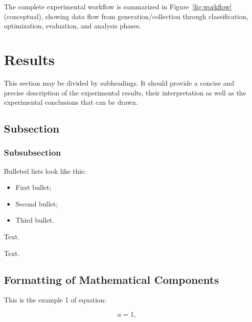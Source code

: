 \documentclass[journal,article,submit,pdftex,moreauthors]{Definitions/mdpi}
\begin{document}
The complete experimental workflow is summarized in Figure~\ref{fig:workflow} (conceptual), showing data flow from generation/collection through classification, optimization, evaluation, and analysis phases.

\section{Results}

This section may be divided by subheadings. It should provide a concise and precise description of the experimental results, their interpretation as well as the experimental conclusions that can be drawn.
\subsection{Subsection}
\subsubsection{Subsubsection}

Bulleted lists look like this:
\begin{itemize}
\item	First bullet;
\item	Second bullet;
\item	Third bullet.
\end{itemize}




Text.

Text.

\subsection{Formatting of Mathematical Components}

This is the example 1 of equation:
\begin{linenomath}
\begin{equation}
a = 1,
\end{equation}
\end{linenomath}
\end{document}
